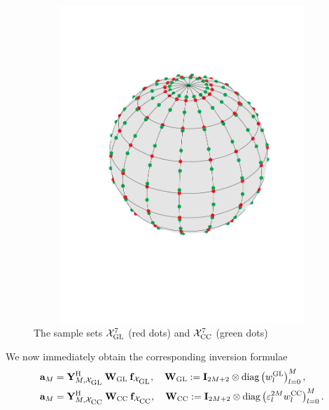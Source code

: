 \begin{figure}[tb]
  \centering
  \includegraphics[height=12cm,width=12cm]{images/quadrature}
  \caption{The sample sets $\mathcal{X}_{\mbox{\scriptsize\rm{GL}}}^{7}$ (red dots) and $\mathcal{X}_{\mbox{\scriptsize\rm{CC}}}^{7}$ (green dots)}
  \label{quadrature}
\end{figure}
We now immediately obtain the corresponding inversion formulae
\begin{equation}
  \label{NFSFT:InversionFormula}
  \begin{split}
    \mathbf{a}_{M} & = \mathbf{Y}_{M,\mathcal{X}_{\mbox{\scriptsize\rm{GL}}}}^{\text{\rm{H}}} \: \mathbf{W}_{\mbox{\scriptsize\rm{GL}}} \: \mathbf{f}_{\mathcal{X}_{\mbox{\scriptsize\rm{GL}}}},\quad \mathbf{W}_{\mbox{\scriptsize\rm{GL}}} := \mathbf{I}_{2M+2} \otimes \text{\rm{diag}}\left(w_{l}^{\mbox{\scriptsize\rm{GL}}}\right)_{l=0}^M,\\
    \mathbf{a}_{M} & = \mathbf{Y}_{M,\mathcal{X}_{\mbox{\scriptsize\rm{CC}}}}^{\text{\rm{H}}} \: \mathbf{W}_{\mbox{\scriptsize\rm{CC}}} \: \mathbf{f}_{\mathcal{X}_{\mbox{\scriptsize\rm{CC}}}},\quad \mathbf{W}_{\mbox{\scriptsize\rm{CC}}} := \mathbf{I}_{2M+2} \otimes \text{\rm{diag}}\left(\varepsilon_{l}^{2M}w_{l}^{\mbox{\scriptsize\rm{CC}}}\right)_{l=0}^M.
  \end{split}  
\end{equation}  
